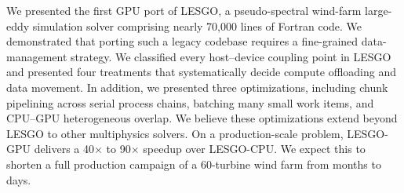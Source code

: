 We presented the first GPU port of LESGO, a pseudo-spectral wind-farm
large-eddy simulation solver comprising nearly 70{,}000 lines of
Fortran code. We demonstrated that porting such a legacy codebase
requires a fine-grained data-management strategy. We classified every
host--device coupling point in LESGO and presented four treatments
that systematically decide compute offloading and data movement. In addition, we presented three
optimizations, including chunk pipelining across serial process chains,
batching many small work items, and CPU--GPU heterogeneous overlap.
We believe these
optimizations extend beyond LESGO to other multiphysics solvers. 
On a production-scale problem, LESGO-GPU delivers a
40$\times$ to 90$\times$ speedup over LESGO-CPU. 
We expect this to shorten a full production campaign of a 
60-turbine wind farm from months to days.
